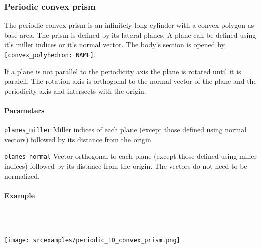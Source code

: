 \subsubsection{Periodic convex prism}
The periodic convex prism is an infinitely long cylinder with a convex polygon as base area. The prism is defined by its lateral planes. A plane can be defined using it's miller indices or it's normal vector. The body's section is opened by \lstinline{[convex_polyhedron: NAME]}.

If a plane is not parallel to the periodicity axis the plane is rotated until it is paralell. The rotation axis is orthogonal to the normal vector of the plane and the periodicity axis and intersects with the origin. 

\paragraph{Parameters}
\begin{description}
 \item{\lstinline{planes_miller}} Miller indices of each plane (except those defined using normal vectors) followed by its distance from the origin.
 \item{\lstinline{planes_normal}} Vector orthogonal to each plane (except those defined using miller indices) followed by its distance from the origin. The vectors do not need to be normalized.
\end{description} 


\paragraph{Example}\


\ \\\texttt{[image: srcexamples/periodic\_1D\_convex\_prism.png]}